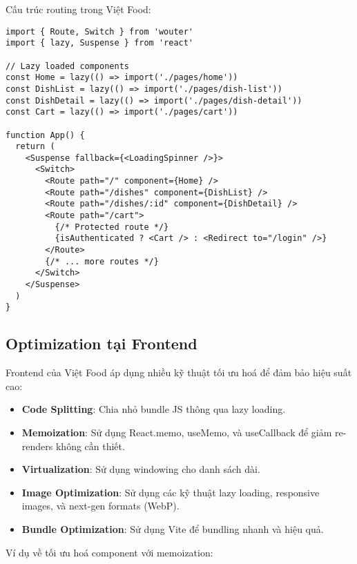Cấu trúc routing trong Việt Food:

\begin{verbatim}
import { Route, Switch } from 'wouter'
import { lazy, Suspense } from 'react'

// Lazy loaded components
const Home = lazy(() => import('./pages/home'))
const DishList = lazy(() => import('./pages/dish-list'))
const DishDetail = lazy(() => import('./pages/dish-detail'))
const Cart = lazy(() => import('./pages/cart'))

function App() {
  return (
    <Suspense fallback={<LoadingSpinner />}>
      <Switch>
        <Route path="/" component={Home} />
        <Route path="/dishes" component={DishList} />
        <Route path="/dishes/:id" component={DishDetail} />
        <Route path="/cart">
          {/* Protected route */}
          {isAuthenticated ? <Cart /> : <Redirect to="/login" />}
        </Route>
        {/* ... more routes */}
      </Switch>
    </Suspense>
  )
}
\end{verbatim}

\subsection{Optimization tại Frontend}

Frontend của Việt Food áp dụng nhiều kỹ thuật tối ưu hoá để đảm bảo hiệu suất cao:

\begin{itemize}
    \item \textbf{Code Splitting}: Chia nhỏ bundle JS thông qua lazy loading.
    \item \textbf{Memoization}: Sử dụng React.memo, useMemo, và useCallback để giảm re-renders không cần thiết.
    \item \textbf{Virtualization}: Sử dụng windowing cho danh sách dài.
    \item \textbf{Image Optimization}: Sử dụng các kỹ thuật lazy loading, responsive images, và next-gen formats (WebP).
    \item \textbf{Bundle Optimization}: Sử dụng Vite để bundling nhanh và hiệu quả.
\end{itemize}

Ví dụ về tối ưu hoá component với memoization:

